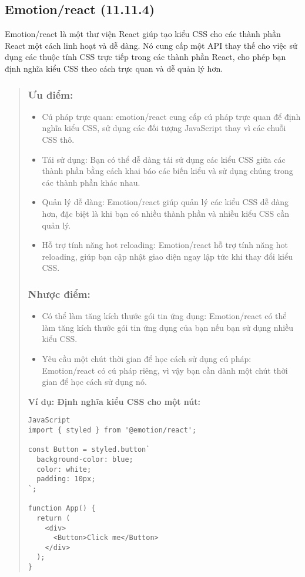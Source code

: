 \subsection{Emotion/react (11.11.4)}
Emotion/react là một thư viện React giúp tạo kiểu CSS cho các thành phần React một cách linh hoạt và dễ dàng. Nó cung cấp một API thay thế cho việc sử dụng các thuộc tính CSS trực tiếp trong các thành phần React, cho phép bạn định nghĩa kiểu CSS theo cách trực quan và dễ quản lý hơn.
\begin{quote}
\subsubsection{Ưu điểm:}
\begin{itemize}
    \item Cú pháp trực quan: emotion/react cung cấp cú pháp trực quan để định nghĩa kiểu CSS, sử dụng các đối tượng JavaScript thay vì các chuỗi CSS thô.
    \item Tái sử dụng: Bạn có thể dễ dàng tái sử dụng các kiểu CSS giữa các thành phần bằng cách khai báo các biến kiểu và sử dụng chúng trong các thành phần khác nhau.
    \item Quản lý dễ dàng: Emotion/react giúp quản lý các kiểu CSS dễ dàng hơn, đặc biệt là khi bạn có nhiều thành phần và nhiều kiểu CSS cần quản lý.
    \item Hỗ trợ tính năng hot reloading: Emotion/react hỗ trợ tính năng hot reloading, giúp bạn cập nhật giao diện ngay lập tức khi thay đổi kiểu CSS.
\end{itemize}
\subsubsection{Nhược điểm:}
\begin{itemize}
    \item Có thể làm tăng kích thước gói tin ứng dụng: Emotion/react có thể làm tăng kích thước gói tin ứng dụng của bạn nếu bạn sử dụng nhiều kiểu CSS.
    \item Yêu cầu một chút thời gian để học cách sử dụng cú pháp: Emotion/react có cú pháp riêng, vì vậy bạn cần dành một chút thời gian để học cách sử dụng nó.
\end{itemize}
    \textbf{Ví dụ: Định nghĩa kiểu CSS cho một nút:}
\begin{lstlisting}
JavaScript
import { styled } from '@emotion/react';

const Button = styled.button`
  background-color: blue;
  color: white;
  padding: 10px;
`;

function App() {
  return (
    <div>
      <Button>Click me</Button>
    </div>
  );
}
\end{lstlisting}
\end{quote}
